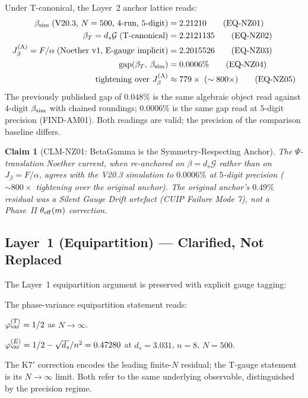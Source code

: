 \documentclass[12pt, a4paper]{article}
\newtheorem{claim}{Claim}[section]   %
\begin{document}
\begin{derivedbox}[title={EQ-NZ01--05: Layer~2 Numerical Lattice}]
Under T-canonical, the Layer~2 anchor lattice reads:
\begin{align}
\beta_{\rm sim}\;(\text{V20.3, }N=500\text{, 4-run, 5-digit}) &= 2.21210
   \tag{EQ-NZ01}\\
\beta_T = d_s\mathcal{G}\;(\text{T-canonical}) &= 2.2121135
   \tag{EQ-NZ02}\\
J_\beta^{(\rm A)} = F/\alpha\;(\text{Noether v1, E-gauge implicit}) &= 2.2015526
   \tag{EQ-NZ03}\\
\text{gap}(\beta_T,\,\beta_{\rm sim}) &= 0.0006\%
   \tag{EQ-NZ04}\\
\text{tightening over }J_\beta^{(\rm A)} &\approx 779\times \;(\sim 800\times)
   \tag{EQ-NZ05}
\end{align}
The previously published gap of $0.048\%$ is the same algebraic object
read against $4$-digit $\beta_{\rm sim}$ with chained roundings;
$0.0006\%$ is the same gap read at $5$-digit precision (FIND-AM01).
Both readings are valid; the precision of the comparison baseline
differs.
\end{derivedbox}

\begin{claim}[CLM-NZ01: BetaGamma is the Symmetry-Respecting Anchor]
The $\Psi$-translation Noether current, when re-anchored on
$\beta = d_s\mathcal{G}$ rather than on $J_\beta = F/\alpha$, agrees
with the V20.3 simulation to $0.0006\%$ at $5$-digit precision
($\sim 800\times$ tightening over the original anchor). The original
anchor's $0.49\%$ residual was a Silent Gauge Drift artefact (CUIP
Failure Mode 7), not a Phase~II $\theta_{\rm eff}(m)$ correction.
\end{claim}

\subsection{Layer~1 (Equipartition) --- Clarified, Not Replaced}

The Layer~1 equipartition argument is preserved with explicit gauge
tagging:

\begin{formalbox}[title={DEF-NZ02: Equipartition under Dual Gauge}]
The phase-variance equipartition statement reads:
\begin{description}[leftmargin=1.2cm,style=nextline]
  \item[T-gauge (thermo-limit, exact)]
        $\varphi_{\rm var}^{(T)} = 1/2$ as $N\to\infty$.
  \item[E-gauge (finite-$N$ via K7$'$)]
        $\varphi_{\rm var}^{(E)} = 1/2 - \sqrt{d_s}/n^2 = 0.47280$
        at $d_s = 3.031$, $n = 8$, $N = 500$.
\end{description}
The K7$'$ correction encodes the leading finite-$N$ residual; the
T-gauge statement is its $N\to\infty$ limit. Both refer to the same
underlying observable, distinguished by the precision regime.
\end{formalbox}
\end{document}
